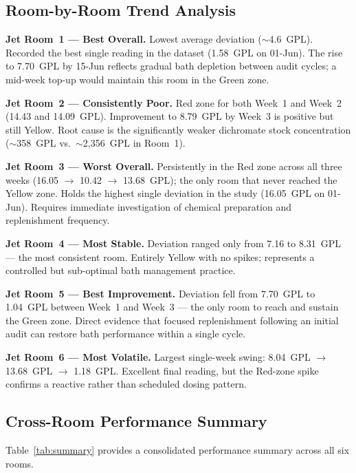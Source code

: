 \documentclass{book}
\begin{document}
\subsection{Room-by-Room Trend Analysis}

\textbf{Jet Room~1 --- Best Overall.}
Lowest average deviation ($\sim$4.6~GPL). Recorded the best single reading in the dataset (1.58~GPL on 01-Jun). The rise to 7.70~GPL by 15-Jun reflects gradual bath depletion between audit cycles; a mid-week top-up would maintain this room in the Green zone.

\textbf{Jet Room~2 --- Consistently Poor.}
Red zone for both Week~1 and Week~2 (14.43 and 14.09~GPL). Improvement to 8.79~GPL by Week~3 is positive but still Yellow. Root cause is the significantly weaker dichromate stock concentration ($\sim$358~GPL vs.\ $\sim$2{,}356~GPL in Room~1).

\textbf{Jet Room~3 --- Worst Overall.}
Persistently in the Red zone across all three weeks (16.05 $\to$ 10.42 $\to$ 13.68~GPL); the only room that never reached the Yellow zone. Holds the highest single deviation in the study (16.05~GPL on 01-Jun). Requires immediate investigation of chemical preparation and replenishment frequency.

\textbf{Jet Room~4 --- Most Stable.}
Deviation ranged only from 7.16 to 8.31~GPL --- the most consistent room. Entirely Yellow with no spikes; represents a controlled but sub-optimal bath management practice.

\textbf{Jet Room~5 --- Best Improvement.}
Deviation fell from 7.70~GPL to 1.04~GPL between Week~1 and Week~3 --- the only room to reach and sustain the Green zone. Direct evidence that focused replenishment following an initial audit can restore bath performance within a single cycle.

\textbf{Jet Room~6 --- Most Volatile.}
Largest single-week swing: 8.04~GPL $\to$ 13.68~GPL $\to$ 1.18~GPL. Excellent final reading, but the Red-zone spike confirms a reactive rather than scheduled dosing pattern.

\subsection{Cross-Room Performance Summary}

Table~\ref{tab:summary} provides a consolidated performance summary across all six rooms.
\end{document}
